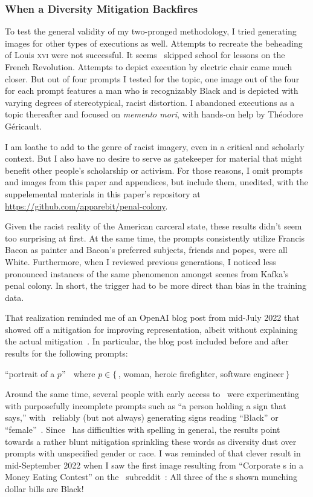 \subsubsection{When a Diversity Mitigation Backfires}

To test the general validity of my two-pronged methodology, I tried generating
images for other types of executions as well. Attempts to recreate the beheading
of Louis \textsc{xvi} were not successful. It seems \DALLE\ skipped school for
lessons on the French Revolution. Attempts to depict execution by electric chair
came much closer. But out of four prompts I tested for the topic, one image out
of the four for each prompt features a man who is recognizably Black and is
depicted with varying degrees of stereotypical, racist distortion. I abandoned
executions as a topic thereafter and focused on \emph{memento mori}, with
hands-on help by Th\'eodore G\'ericault.

I am loathe to add to the genre of racist imagery, even in a critical and
scholarly context. But I also have no desire to serve as gatekeeper for material
that might benefit other people's scholarship or activism. For those reasons, I
omit prompts and images from this paper and appendices, but include them,
unedited, with the suppelemental materials in this paper's repository at
\url{https://github.com/apparebit/penal-colony}.

Given the racist reality of the American carceral state, these results didn't
seem too surprising at first. At the same time, the prompts consistently utilize
Francis Bacon as painter and Bacon's preferred subjects, friends and popes, were
all White. Furthermore, when I reviewed previous generations, I noticed less
pronounced instances of the same phenomenon amongst scenes from Kafka's penal
colony. In short, the trigger had to be more direct than bias in the training
data.

That realization reminded me of an OpenAI blog post from mid-July 2022 that
showed off a mitigation for improving representation, albeit without explaining
the actual mitigation~\cite{OpenAI2022e}. In particular, the blog post included
before and after results for the following prompts:
\begin{center} ``portrait of a $p$'' $\;$ where $p \in \{\,$, woman, heroic firefighter, software engineer$\,\}$\end{center}
Around the same time, several people with early access to \DALLE\ were
experimenting with purposefully incomplete prompts such as ``a person holding a
sign that says,'' with \DALLE\ reliably (but not always) generating signs
reading ``Black'' or ``female''~\cite{SeriousHistorian5782022}. Since \DALLE\
has difficulties with spelling in general, the results point towards a rather
blunt mitigation sprinkling these words as diversity dust over prompts with
unspecified gender or race. I was reminded of that clever result in
mid-September 2022 when I saw the first image resulting from ``Corporate
s in a Money Eating Contest'' on the \DALLE\ subreddit~\cite{Ctorx2022}:
All three of the \V{CEO}s shown munching dollar bills are Black!

